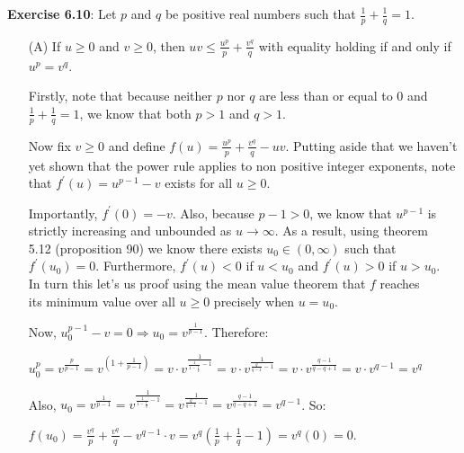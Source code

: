 \documentclass{book}
\newcommand{\pracTwo}{
   \color{Orange}%
   \fontsize{12}{14}\selectfont%
}
\newenvironment{myIndent}{%
   \begin{adjustwidth}{2.5em}{0em}%
}{%
   \end{adjustwidth}%
}
\newcommand{\retTwo}{\hfill\bigbreak}
\begin{document}
\newpage

\textbf{Exercise 6.10}: Let $p$ and $q$ be positive real numbers such that $\frac{1}{p} + \frac{1}{q} = 1$.

\begin{itemize}
   \item[(A)] If $u \geq 0$ and $v \geq 0$, then $uv \leq \frac{u^p}{p} + \frac{v^q}{q}$ with equality holding if and only if $u^p = v^q$.
   {\begin{myIndent}\pracTwo
      Firstly, note that because neither $p$ nor $q$ are less than or equal to $0$ and\\ $\frac{1}{p} + \frac{1}{q} = 1$, we know that both $p > 1$ and $q > 1$.\retTwo

      Now fix $v \geq 0$ and define $f(u) = \frac{u^p}{p} + \frac{v^q}{q} - uv$. Putting aside that we haven't\\ yet shown that the power rule applies to non positive integer exponents, note\\ that $f^\prime(u) = u^{p-1} - v$ exists for all $u \geq 0$.\retTwo
      
      Importantly, $f^\prime(0) = -v$. Also, because $p - 1 > 0$, we know that $u^{p-1}$ is\\ strictly increasing and unbounded as $u \rightarrow \infty$. As a result, using theorem\\ 5.12 (proposition 90) we know there exists $u_0 \in (0, \infty)$ such that\\ $f^\prime(u_0) = 0$. Furthermore, $f^\prime(u) < 0$ if $u < u_0$ and $f^\prime(u) > 0$ if $u > u_0$.\\ In turn this let's us proof using the mean value theorem that $f$ reaches\\ its minimum value over all $u \geq 0$ precisely when $u = u_0$.\retTwo

      Now, $u_0^{p-1} - v = 0 \Longrightarrow u_0 = v^{\frac{1}{p-1}}$. Therefore:\\ [-14pt]

      {\centering $u_0^p = v^\frac{p}{p-1} = v^{(1 + \frac{1}{p - 1})} = v \cdot v^{\frac{1}{\frac{1}{1 - \frac{1}{q}} - 1}} = v\cdot v^{\frac{1}{\frac{q}{q-1} - 1}} = v \cdot v^{\frac{q-1}{q - q + 1}} = v\cdot v^{q-1} = v^q$ \retTwo\par}

      Also, $u_0 = v^{\frac{1}{p-1}} = v^{\frac{1}{\frac{1}{1 - \frac{1}{q}} - 1}} = v^{\frac{1}{\frac{q}{q-1} - 1}} = v^{\frac{q-1}{q - q + 1}} = v^{q-1}$. So:
      
      {\centering $f(u_0) = \frac{v^q}{p} + \frac{v^q}{q} - v^{q-1}\cdot v = v^q\left(\frac{1}{p} + \frac{1}{q} - 1\right) = v^q(0) = 0$. \retTwo\par}


\end{myIndent}}
\end{itemize}
\end{document}
